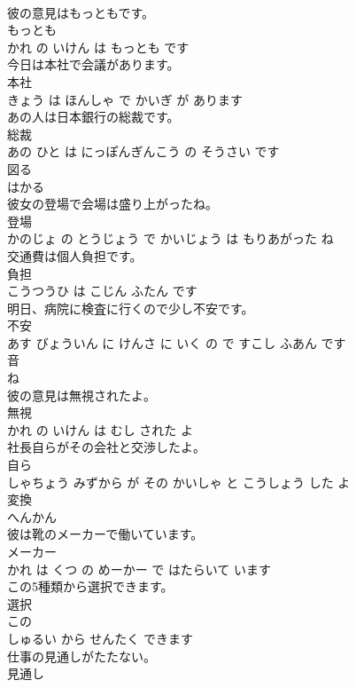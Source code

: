\documentclass[8pt]{extreport}
\begin{document}
\begin{CJK}{UTF8}{min}
\\	彼の意見はもっともです。	
\\	もっとも 
\\	かれ の いけん は もっとも です			
\\	今日は本社で会議があります。	
\\	本社 
\\	きょう は ほんしゃ で かいぎ が あります			
\\	あの人は日本銀行の総裁です。	
\\	総裁 
\\	あの ひと は にっぽんぎんこう の そうさい です			
\\	図る	
\\	はかる		
\\	彼女の登場で会場は盛り上がったね。	
\\	登場 
\\	かのじょ の とうじょう で かいじょう は もりあがった ね			
\\	交通費は個人負担です。	
\\	負担 
\\	こうつうひ は こじん ふたん です			
\\	明日、病院に検査に行くので少し不安です。	
\\	不安 
\\	あす びょういん に けんさ に いく の で すこし ふあん です			
\\	音	
\\	ね		
\\	彼の意見は無視されたよ。	
\\	無視 
\\	かれ の いけん は むし された よ			
\\	社長自らがその会社と交渉したよ。	
\\	自ら 
\\	しゃちょう みずから が その かいしゃ と こうしょう した よ			
\\	変換	
\\	へんかん		
\\	彼は靴のメーカーで働いています。	
\\	メーカー 
\\	かれ は くつ の めーかー で はたらいて います			
\\	この5種類から選択できます。	
\\	選択 
\\	この 
\\	しゅるい から せんたく できます			
\\	仕事の見通しがたたない。	
\\	見通し 

\end{CJK}
\end{document}
